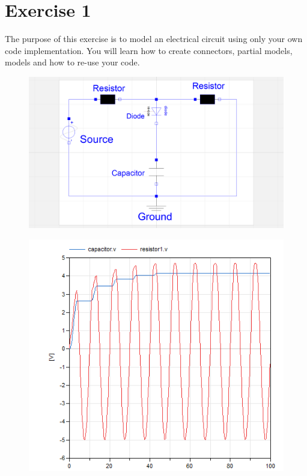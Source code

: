 \documentclass[10pt,a4paper]{article}
\author{Iago Cupeiro Figueroa}
\begin{document}
\section*{Exercise 1}
The purpose of this exercise is to model an electrical circuit using only your own code implementation. You will learn how to create connectors, partial models, models and how to re-use your code.

\begin{figure}[h]
\centering
\begin{minipage}{.5\textwidth}
  \centering
  \includegraphics[width=1\linewidth]{Figures/circuit.png}
  \label{fig:cir}
\end{minipage}%
\begin{minipage}{.5\textwidth}
  \centering
  \includegraphics[width=.8\linewidth]{Figures/result.png}
  \label{fig:res}
\end{minipage}
\end{figure}
\end{document}
